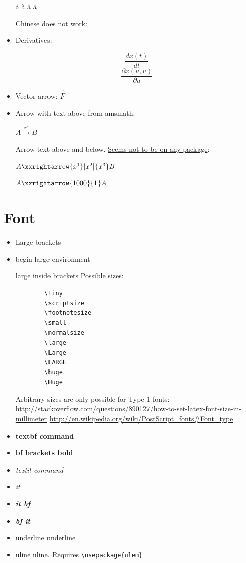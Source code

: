 \documentclass[12pt]{article}
\begin{document}
\begin{itemize}
      á à â ä

      Chinese does not work: %

    \item Derivatives:

      $$ \frac{dx(t)}{dt} $$
      $$ \frac{\partial x(u,v)}{\partial u} $$

    \item Vector arrow: $\vec{F}$

    \item
      Arrow with text above from amsmath:

        $A\xrightarrow{x^2}B$

      Arrow text above and below. \href{http://tex.stackexchange.com/questions/27545/custom-length-arrows-text-over-and-under}{Seems not to be on any package}:

        $A\xxrightarrow{x^1}[x^2]{x^3}B$

        $A\xxrightarrow{1000}{1}A$
  \end{itemize}

\section{Font}\label{font}

  \begin{itemize}
    \item {\Large Large brackets}
    \item
      \begin{Large}begin large environment\end{Large}
      {\Large large inside brackets}
      Possible sizes:
      \begin{lstlisting}
        \tiny
        \scriptsize
        \footnotesize
        \small
        \normalsize
        \large
        \Large
        \LARGE
        \huge
        \Huge
      \end{lstlisting}

      Arbitrary sizes are only possible for Type 1 fonts: \url{http://stackoverflow.com/questions/890127/how-to-set-latex-font-size-in-millimeter}
      \url{http://en.wikipedia.org/wiki/PostScript_fonts#Font_type}
    \item \textbf{textbf command}
    \item {\bf bf brackets bold}
    \item \textit{textit command}
    \item {\it it}
    \item {\it \bf it bf}
    \item {\bf \it bf it}
    \item \underline{underline underline}
    \item \uline{uline uline}. Requires \lstinline|\usepackage{ulem}|
  \end{itemize}
\end{document}
